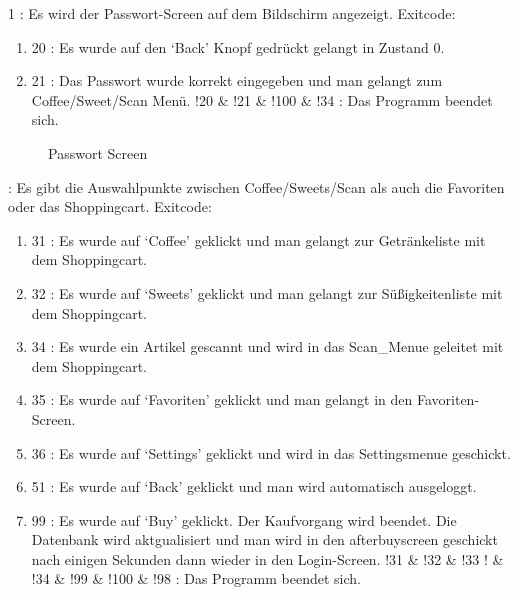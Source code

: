 \documentclass[11pt,a4paper]{article} %
\begin{document}
	\par
		1 : Es wird der Passwort-Screen auf dem Bildschirm angezeigt.
			Exitcode:
\begin{enumerate}			
			\item	20 : Es wurde auf den `Back' Knopf gedrückt gelangt in Zustand 0.
			\item	21 : Das Passwort wurde korrekt eingegeben und man gelangt zum Coffee/Sweet/Scan Menü.
				!20 \& !21 \& !100 \& !34 : Das Programm beendet sich.
\end{enumerate}		
\begin{figure}[h]
	\caption{Passwort Screen}
	\end{figure}	
 : Es gibt die Auswahlpunkte zwischen Coffee/Sweets/Scan als auch die Favoriten oder das Shoppingcart.
			Exitcode:
\begin{enumerate}			
			\item	31 : Es wurde auf `Coffee' geklickt und man gelangt zur Getränkeliste mit dem Shoppingcart.
			\item	32 : Es wurde auf `Sweets' geklickt und man gelangt zur Süßigkeitenliste mit dem Shoppingcart.
			\item	34 : Es wurde ein Artikel gescannt und wird in das Scan\_Menue geleitet mit dem Shoppingcart.
			\item	35 : Es wurde auf `Favoriten' geklickt und man gelangt in den Favoriten-Screen.
			\item	36 : Es wurde auf `Settings' geklickt und wird in das Settingsmenue geschickt.
			\item	51 : Es wurde auf `Back' geklickt und man wird automatisch ausgeloggt.
			\item	99 : Es wurde auf `Buy' geklickt. Der Kaufvorgang wird beendet. Die Datenbank wird aktgualisiert und man wird in den afterbuyscreen geschickt nach einigen 						Sekunden dann wieder in den Login-Screen.
				!31 \& !32 \& !33 ! \& !34 \& !99 \& !100 \& !98 : Das Programm beendet sich.
\end{enumerate}	
\end{document}
